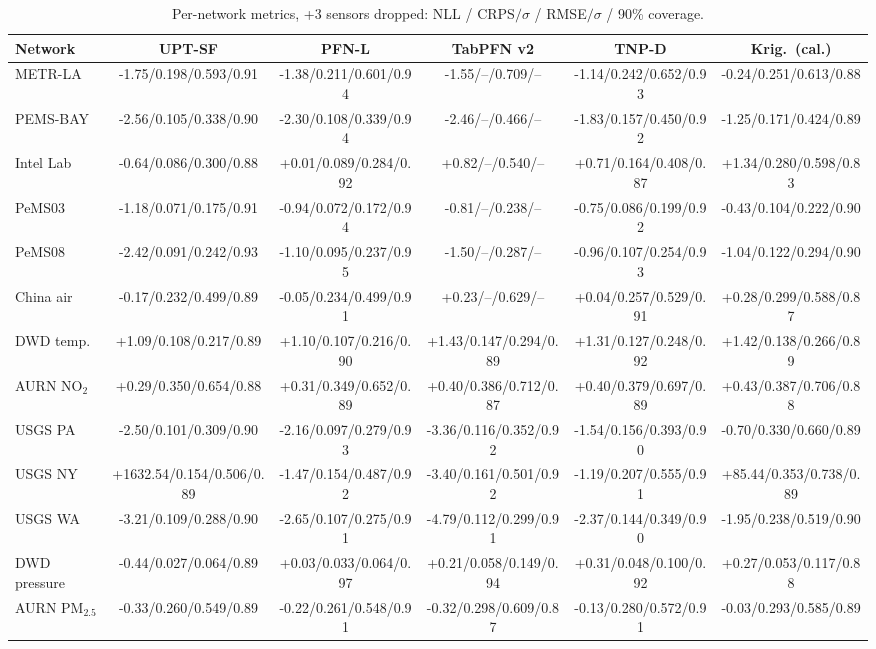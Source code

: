 \begin{table}[h]\centering\scriptsize
\caption{Per-network metrics, +3 sensors dropped: NLL / CRPS$/\sigma$ / RMSE$/\sigma$ / 90\% coverage.}
\setlength{\tabcolsep}{2pt}
\begin{adjustbox}{max width=\linewidth}
\begin{tabular}{lccccc}
\toprule
Network & UPT-SF & PFN-L & TabPFN v2 & TNP-D & Krig.\ (cal.) \\
\midrule
METR-LA & -1.75/0.198/0.593/0.91 & -1.38/0.211/0.601/0.94 & -1.55/--/0.709/-- & -1.14/0.242/0.652/0.93 & -0.24/0.251/0.613/0.88 \\
PEMS-BAY & -2.56/0.105/0.338/0.90 & -2.30/0.108/0.339/0.94 & -2.46/--/0.466/-- & -1.83/0.157/0.450/0.92 & -1.25/0.171/0.424/0.89 \\
Intel Lab & -0.64/0.086/0.300/0.88 & +0.01/0.089/0.284/0.92 & +0.82/--/0.540/-- & +0.71/0.164/0.408/0.87 & +1.34/0.280/0.598/0.83 \\
PeMS03 & -1.18/0.071/0.175/0.91 & -0.94/0.072/0.172/0.94 & -0.81/--/0.238/-- & -0.75/0.086/0.199/0.92 & -0.43/0.104/0.222/0.90 \\
PeMS08 & -2.42/0.091/0.242/0.93 & -1.10/0.095/0.237/0.95 & -1.50/--/0.287/-- & -0.96/0.107/0.254/0.93 & -1.04/0.122/0.294/0.90 \\
China air & -0.17/0.232/0.499/0.89 & -0.05/0.234/0.499/0.91 & +0.23/--/0.629/-- & +0.04/0.257/0.529/0.91 & +0.28/0.299/0.588/0.87 \\
DWD temp. & +1.09/0.108/0.217/0.89 & +1.10/0.107/0.216/0.90 & +1.43/0.147/0.294/0.89 & +1.31/0.127/0.248/0.92 & +1.42/0.138/0.266/0.89 \\
AURN NO$_2$ & +0.29/0.350/0.654/0.88 & +0.31/0.349/0.652/0.89 & +0.40/0.386/0.712/0.87 & +0.40/0.379/0.697/0.89 & +0.43/0.387/0.706/0.88 \\
USGS PA & -2.50/0.101/0.309/0.90 & -2.16/0.097/0.279/0.93 & -3.36/0.116/0.352/0.92 & -1.54/0.156/0.393/0.90 & -0.70/0.330/0.660/0.89 \\
USGS NY & +1632.54/0.154/0.506/0.89 & -1.47/0.154/0.487/0.92 & -3.40/0.161/0.501/0.92 & -1.19/0.207/0.555/0.91 & +85.44/0.353/0.738/0.89 \\
USGS WA & -3.21/0.109/0.288/0.90 & -2.65/0.107/0.275/0.91 & -4.79/0.112/0.299/0.91 & -2.37/0.144/0.349/0.90 & -1.95/0.238/0.519/0.90 \\
DWD pressure & -0.44/0.027/0.064/0.89 & +0.03/0.033/0.064/0.97 & +0.21/0.058/0.149/0.94 & +0.31/0.048/0.100/0.92 & +0.27/0.053/0.117/0.88 \\
AURN PM$_{2.5}$ & -0.33/0.260/0.549/0.89 & -0.22/0.261/0.548/0.91 & -0.32/0.298/0.609/0.87 & -0.13/0.280/0.572/0.91 & -0.03/0.293/0.585/0.89 \\
\bottomrule
\end{tabular}
\end{adjustbox}
\end{table}
